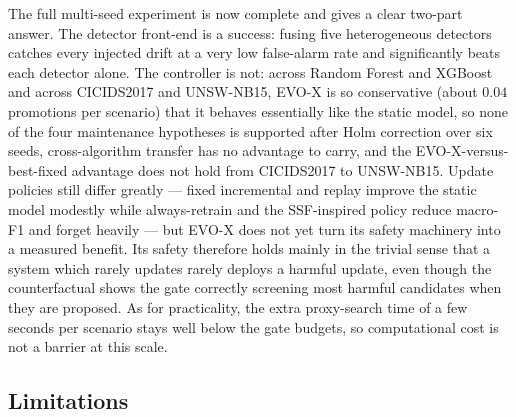 \documentclass{article}
\begin{document}
The full multi-seed experiment is now complete and gives a clear two-part answer. The detector front-end is a success: fusing five heterogeneous detectors catches every injected drift at a very low false-alarm rate and significantly beats each detector alone. The controller is not: across Random Forest and XGBoost and across CICIDS2017 and UNSW-NB15, EVO-X is so conservative (about $0.04$ promotions per scenario) that it behaves essentially like the static model, so none of the four maintenance hypotheses is supported after Holm correction over six seeds, cross-algorithm transfer has no advantage to carry, and the EVO-X-versus-best-fixed advantage does not hold from CICIDS2017 to UNSW-NB15. Update policies still differ greatly --- fixed incremental and replay improve the static model modestly while always-retrain and the SSF-inspired policy reduce macro-F1 and forget heavily --- but EVO-X does not yet turn its safety machinery into a measured benefit. Its safety therefore holds mainly in the trivial sense that a system which rarely updates rarely deploys a harmful update, even though the counterfactual shows the gate correctly screening most harmful candidates when they are proposed. As for practicality, the extra proxy-search time of a few seconds per scenario stays well below the gate budgets, so computational cost is not a barrier at this scale.

    \subsection{Limitations}
\end{document}
